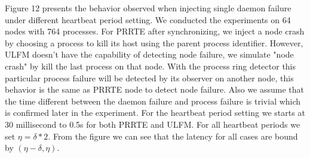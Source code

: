 \documentclass[sigconf]{acmart}
\newcommand{\prrte}[0]{\textsc{PRRTE}\xspace}
\newcommand{\ulfm}[0]{\textsc{ULFM}\xspace}
\begin{document}
Figure 12 presents the behavior observed when injecting single daemon failure under different heartbeat period setting. We conducted the experiments on 64 nodes with 764 processes. For \prrte after synchronizing, we inject a node crash by choosing a process to kill its host using the parent process identifier. However, \ulfm doesn't have the capability of detecting node failure, we simulate "node crash" by kill the last process on that node. With the process ring detector this particular process failure will be detected by its observer on another node, this behavior is the same as \prrte node to detect node failure. Also we assume that the time different between the daemon failure and process failure is trivial which is confirmed later in the experiment. For the heartbeat period setting we starts at 30 millisecond to 0.5s for both \prrte and \ulfm. For all heartbeat periods we set $ \eta = \delta * 2 $. From the figure we can see that the latency for all cases are bound by $ (\eta - \delta,\eta) $.
\end{document}
